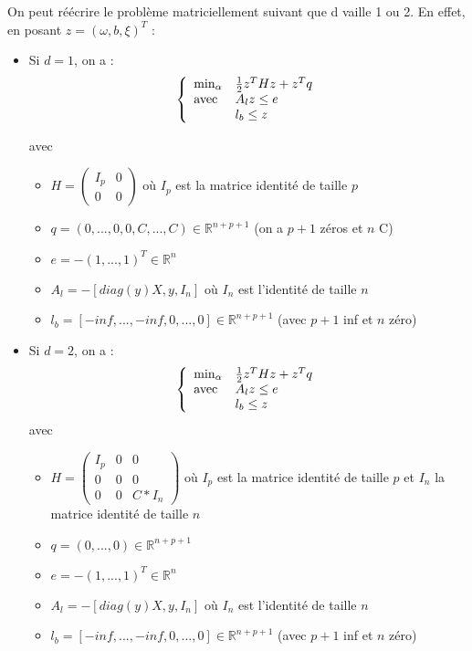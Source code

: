 \bigskip
On peut réécrire le problème matriciellement suivant que d vaille 1 ou 2. En effet, en posant $z=(\omega,b,\xi)^T$ :
\begin{itemize}
	\item Si $d=1$, on a :
		\[\left\{\begin{array}{l l}
		\min_\alpha & \frac{1}{2} z^THz +z^Tq\\
		\text{avec } & A_l z\leq e\\
			& l_b \leq z
		\end{array}\right.\]

	\renewcommand\labelitemii{\textbullet}
	avec \begin{itemize}
		\item $H=\begin{pmatrix} I_p & 0 \\ 0 & 0 \end{pmatrix}$ où $I_p$ est la matrice identité de taille $p$
		\item $q=(0,...,0,0,C,...,C)\in\mathbb{R}^{n+p+1}$ (on a $p+1$ zéros et $n$ C)
		\item $e=-(1,...,1)^T \in\mathbb{R}^{n}$
		\item $A_l=-[diag(y)X,y,I_n]$ où $I_n$ est l'identité de taille $n$
		\item $l_b=[-inf,...,-inf,0,...,0]\in\mathbb{R}^{n+p+1}$ (avec $p+1$ inf et $n$ zéro)
	     \end{itemize}
		
	\item Si $d=2$, on a :
		\[\left\{\begin{array}{l l}
		\min_\alpha & \frac{1}{2} z^THz +z^Tq\\
		\text{avec } & A_l z\leq e\\
			& l_b \leq z
		\end{array}\right.\]
	avec \begin{itemize}
		\item $H=\begin{pmatrix} I_p & 0 & 0 \\ 0 & 0 & 0 \\ 0 & 0 & C*I_n \end{pmatrix}$ où $I_p$ est la matrice identité de taille $p$ et $I_n$ la matrice identité de taille $n$
		\item $q=(0,...,0)\in\mathbb{R}^{n+p+1}$
		\item $e=-(1,...,1)^T \in\mathbb{R}^{n}$
		\item $A_l=-[diag(y)X,y,I_n]$ où $I_n$ est l'identité de taille $n$
		\item $l_b=[-inf,...,-inf,0,...,0]\in\mathbb{R}^{n+p+1}$ (avec $p+1$ inf et $n$ zéro)
	     \end{itemize}
\end{itemize}

